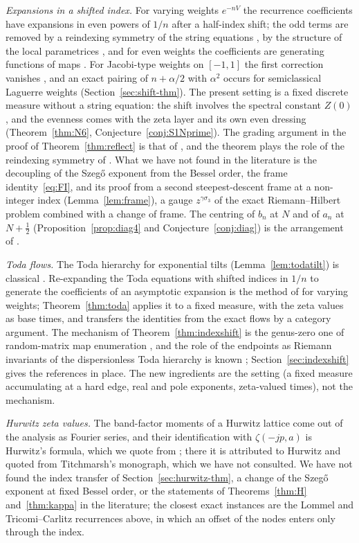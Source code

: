\emph{Expansions in a shifted index.} For varying weights $e^{-nV}$ the recurrence coefficients have expansions in even
powers of $1/n$ after a half-index shift; the odd terms are removed by a reindexing symmetry of the string equations
\cite{BleherIts}, by the structure of the local parametrices \cite{KuijlaarsTibboel}, and for even weights the coefficients are
generating functions of maps \cite{EMP}. For Jacobi-type weights on $[-1,1]$ the first correction vanishes \cite{KMVV}, and an exact pairing of
$n+\alpha/2$ with $\alpha^2$ occurs for semiclassical Laguerre weights \cite{FilipukVanAsscheZhang} (Section~\ref{sec:shift-thm}). The present setting is a
fixed discrete measure without a string equation: the shift involves the spectral constant $Z(0)$, and the evenness comes with the zeta
layer and its own even dressing (Theorem~\ref{thm:N6}, Conjecture~\ref{conj:S1Nprime}). The grading argument in the proof of
Theorem~\ref{thm:reflect} is that of \cite[Lemma~4.1]{KuijlaarsTibboel}, and the theorem plays the role of the reindexing symmetry of
\cite{BleherIts}. What we have not found in the literature is the decoupling of the Szeg\H{o} exponent from the Bessel order, the frame
identity~\eqref{eq:FI}, and its proof from a second steepest-descent frame at a non-integer index (Lemma~\ref{lem:frame}), a gauge
$z^{\gamma\sigma_3}$ of the exact Riemann--Hilbert problem combined with a change of frame. The centring of $b_n$ at $N$ and of $a_n$ at
$N+\frac12$ (Proposition~\ref{prop:diag4} and Conjecture~\ref{conj:diag}) is the arrangement of \cite[Theorem~5.2]{BleherIts}.

\emph{Toda flows.} The Toda hierarchy for exponential tilts (Lemma~\ref{lem:todatilt}) is classical \cite{VanAsscheToda}. Re-expanding
the Toda equations with shifted indices in $1/n$ to generate the coefficients of an asymptotic expansion is the method of
\cite[Section~4]{EMP} for varying weights; Theorem~\ref{thm:toda} applies it to a fixed measure, with the zeta values as base times,
and transfers the identities from the exact flows by a category argument. The mechanism of Theorem~\ref{thm:indexshift} is the
genus-zero one of random-matrix map enumeration \cite{Ercolani,EMP,Bouttier}, and the role of the endpoints as Riemann invariants of
the dispersionless Toda hierarchy is known \cite{KonopelchenkoMAM}; Section~\ref{sec:indexshift} gives the references in place. The
new ingredients are the setting (a fixed measure accumulating at a hard edge, real and pole exponents, zeta-valued times), not the
mechanism.

\emph{Hurwitz zeta values.} The band-factor moments of a Hurwitz lattice come out of the analysis as Fourier series, and their
identification with $\zeta(-jp,a)$ is Hurwitz's formula, which we quote from \cite[Theorem~1.1]{DixitKumar}; there it is attributed to
Hurwitz and quoted from Titchmarsh's monograph, which we have not consulted. We have not found the index transfer of
Section~\ref{sec:hurwitz-thm}, a change of the Szeg\H{o} exponent at fixed Bessel order, or the statements of Theorems~\ref{thm:H}
and~\ref{thm:kappa} in the literature; the closest exact instances are the Lommel and Tricomi--Carlitz recurrences above, in which an
offset of the nodes enters only through the index.


